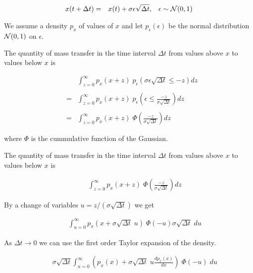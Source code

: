 {{\begin{eqnarray*}
x(t + \Delta t) & = & x(t) + \sigma \epsilon \sqrt{\Delta t},\;\;\;\epsilon \sim {\cal N}(0,1)
\end{eqnarray*}

\vfill
We assume a density $p_x$ of values of $x$ and let $p_\epsilon(\epsilon)$ be the normal distribution ${\cal N}(0,1)$ on $\epsilon$.

\vfill
The quantity of mass transfer in the time interval $\Delta t$ from values above $x$ to values below $x$ is

\begin{eqnarray*}
& & \int_{z = 0}^\infty  p_x(x + z)\;p_\epsilon(\sigma\epsilon\sqrt{\Delta t} \leq -z) dz  \\
\\
& = & \int_{z = 0}^\infty  p_x(x + z)\;p_\epsilon\left(\epsilon \leq \frac{-z}{\sigma\sqrt{\Delta t}}\right) dz  \\
\\
& =  & \int_{z = 0}^\infty p_x(x+z)\;\Phi\left(\frac{-z}{\sigma\sqrt{\Delta t}}\right) dz
\end{eqnarray*}

\vfill
where $\Phi$ is the cummulative function of the Gaussian.
}

{\Large

The quantity of mass transfer in the time interval $\Delta t$ from values above $x$ to values below $x$ is


\begin{eqnarray*}
&  & \int_{z = 0}^\infty p_x(x+z)\;\Phi\left(\frac{-z}{\sigma\sqrt{\Delta t}}\right) dz
\end{eqnarray*}

By a change of variables $u = z/(\sigma\sqrt{\Delta t})$ we get

\begin{eqnarray*}
&  & \int_{u = 0}^\infty p_x(x+\sigma\sqrt{\Delta t}\;u)\;\Phi(-u) \sigma\sqrt{\Delta t}\;du
\end{eqnarray*}

\vfill
As $\Delta t \rightarrow 0$ we can use the first order Taylor expansion of the density.

\begin{eqnarray*}
&  & \sigma\sqrt{\Delta t} \int_{u = 0}^\infty \left(p_x(x)+\sigma\sqrt{\Delta t}\;u \frac{dp_x(x)}{dx}\right)\;\Phi(-u)\;du
\end{eqnarray*}
}

{\Large

}}
